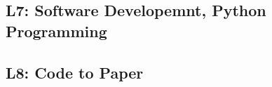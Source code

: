 \documentclass{article}
\begin{document}

\begin{center}
    \section*{L7: Software Developemnt, Python Programming}
\end{center}

\newpage

\begin{center}
    \section*{L8: Code to Paper}
\end{center}

\newpage
\end{document}
